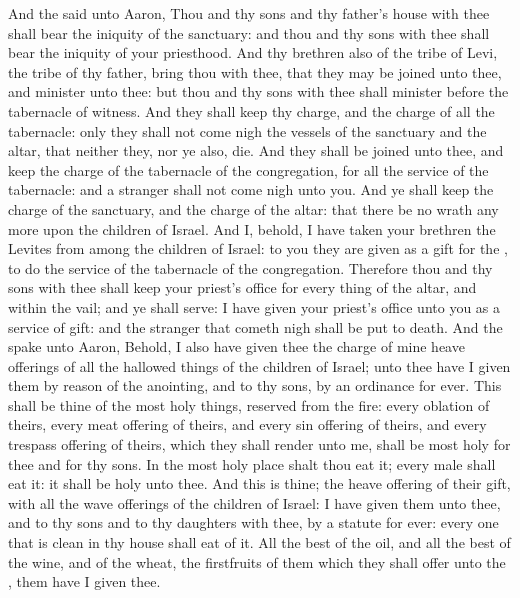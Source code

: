 \begin{biblechapter} %
 And the \LORD said unto Aaron, Thou and thy sons and thy father's house with thee shall bear the iniquity of the sanctuary: and thou and thy sons with thee shall bear the iniquity of your priesthood.
\verse And thy brethren also of the tribe of Levi, the tribe of thy father, bring thou with thee, that they may be joined unto thee, and minister unto thee: but thou and thy sons with thee shall minister before the tabernacle of witness.
\verse And they shall keep thy charge, and the charge of all the tabernacle: only they shall not come nigh the vessels of the sanctuary and the altar, that neither they, nor ye also, die.
\verse And they shall be joined unto thee, and keep the charge of the tabernacle of the congregation, for all the service of the tabernacle: and a stranger shall not come nigh unto you.
\verse And ye shall keep the charge of the sanctuary, and the charge of the altar: that there be no wrath any more upon the children of Israel.
\verse And I, behold, I have taken your brethren the Levites from among the children of Israel: to you they are given as a gift for the \LORD, to do the service of the tabernacle of the congregation.
\verse Therefore thou and thy sons with thee shall keep your priest's office for every thing of the altar, and within the vail; and ye shall serve: I have given your priest's office unto you as a service of gift: and the stranger that cometh nigh shall be put to death.
 And the \LORD spake unto Aaron, Behold, I also have given thee the charge of mine heave offerings of all the hallowed things of the children of Israel; unto thee have I given them by reason of the anointing, and to thy sons, by an ordinance for ever.
\verse This shall be thine of the most holy things, reserved from the fire: every oblation of theirs, every meat offering of theirs, and every sin offering of theirs, and every trespass offering of theirs, which they shall render unto me, shall be most holy for thee and for thy sons.
\verse In the most holy place shalt thou eat it; every male shall eat it: it shall be holy unto thee.
\verse And this is thine; the heave offering of their gift, with all the wave offerings of the children of Israel: I have given them unto thee, and to thy sons and to thy daughters with thee, by a statute for ever: every one that is clean in thy house shall eat of it.
\verse All the best of the oil, and all the best of the wine, and of the wheat, the firstfruits of them which they shall offer unto the \LORD, them have I given thee.

\end{biblechapter}
